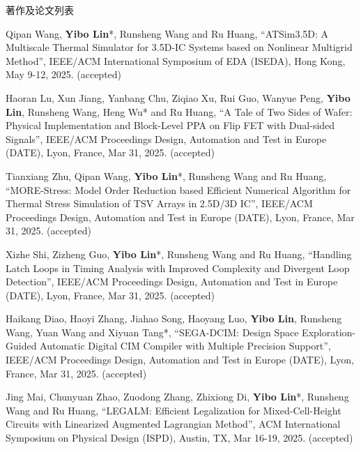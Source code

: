 \begin{rSection}{著作及论文列表}
\begin{description}[font=\normalfont, rightmargin=2em]
\item[{[C175]}]{
        Qipan Wang, \textbf{Yibo Lin}*, Runsheng Wang and Ru Huang, 
    ``ATSim3.5D: A Multiscale Thermal Simulator for 3.5D-IC Systems based on Nonlinear Multigrid Method'', 
    IEEE/ACM International Symposium of EDA (ISEDA), Hong Kong, May 9-12, 2025.
    (accepted)
}
            

\item[{[C174]}]{
        Haoran Lu, Xun Jiang, Yanbang Chu, Ziqiao Xu, Rui Guo, Wanyue Peng, \textbf{Yibo Lin}, Runsheng Wang, Heng Wu* and Ru Huang, 
    ``A Tale of Two Sides of Wafer: Physical Implementation and Block-Level PPA on Flip FET with Dual-sided Signals'', 
    IEEE/ACM Proceedings Design, Automation and Test in Europe (DATE), Lyon, France, Mar 31, 2025.
    (accepted)
}
            

\item[{[C173]}]{
        Tianxiang Zhu, Qipan Wang, \textbf{Yibo Lin}*, Runsheng Wang and Ru Huang, 
    ``MORE-Stress: Model Order Reduction based Efficient Numerical Algorithm for Thermal Stress Simulation of TSV Arrays in 2.5D/3D IC'', 
    IEEE/ACM Proceedings Design, Automation and Test in Europe (DATE), Lyon, France, Mar 31, 2025.
    (accepted)
}
            

\item[{[C172]}]{
        Xizhe Shi, Zizheng Guo, \textbf{Yibo Lin}*, Runsheng Wang and Ru Huang, 
    ``Handling Latch Loops in Timing Analysis with Improved Complexity and Divergent Loop Detection'', 
    IEEE/ACM Proceedings Design, Automation and Test in Europe (DATE), Lyon, France, Mar 31, 2025.
    (accepted)
}
            

\item[{[C171]}]{
        Haikang Diao, Haoyi Zhang, Jiahao Song, Haoyang Luo, \textbf{Yibo Lin}, Runsheng Wang, Yuan Wang and Xiyuan Tang*, 
    ``SEGA-DCIM: Design Space Exploration-Guided Automatic Digital CIM Compiler with Multiple Precision Support'', 
    IEEE/ACM Proceedings Design, Automation and Test in Europe (DATE), Lyon, France, Mar 31, 2025.
    (accepted)
}
            

\item[{[C170]}]{
        Jing Mai, Chunyuan Zhao, Zuodong Zhang, Zhixiong Di, \textbf{Yibo Lin}*, Runsheng Wang and Ru Huang, 
    ``LEGALM: Efficient Legalization for Mixed-Cell-Height Circuits with Linearized Augmented Lagrangian Method'', 
    ACM International Symposium on Physical Design (ISPD), Austin, TX, Mar 16-19, 2025.
    (accepted)
}
            


\end{description}
\end{rSection}
